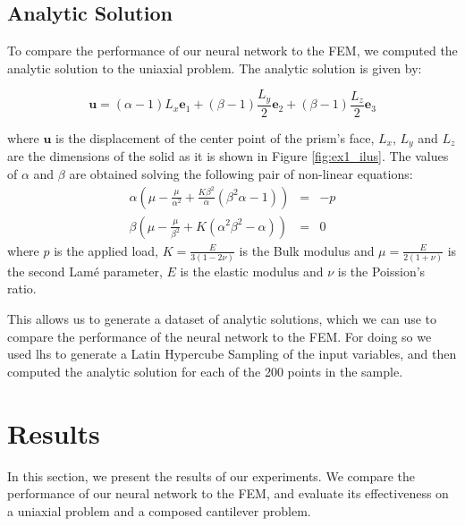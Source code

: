 \documentclass[11pt]{scrartcl} %
\begin{document}
\subsection{Analytic Solution}
To compare the performance of our neural network to the FEM, we computed the analytic solution to the uniaxial problem. The analytic solution is given by:

\begin{equation}
\label{eq:analytic_solution}
\boldsymbol{u} = 
(\alpha - 1)L_x \boldsymbol{e}_1 
+   
(\beta - 1) \frac{L_y}{2}  \boldsymbol{e}_2 
+   
(\beta - 1)\frac{L_z}{2} \boldsymbol{e}_3 
\end{equation}

where $\boldsymbol{u}$ is the displacement of the center point of the prism's face, $L_x$, $L_y$ and $L_z$ are the dimensions of the solid as it is shown in Figure \ref{fig:ex1_ilus}. The values of $\alpha$ and $\beta$ are obtained solving the following pair of non-linear equations:
%
\begin{eqnarray}
\alpha \left( 
\mu -  \frac{\mu}{\alpha^2} + \frac{K\beta^2}{\alpha} (\beta^2 \alpha -1)  
\right) &=& - p \\
\beta \left( 
	\mu -  \frac{\mu}{\beta^2} + K (\alpha^2\beta^2 - \alpha) 
 \right) &=& 0
\end{eqnarray}
%
where  $p$ is the applied load, $K = \frac{E}{3(1 - 2\nu)}$ is the Bulk modulus and $\mu = \frac{E}{2(1 + \nu)}$ is the second Lamé parameter, $E$ is the elastic modulus and $\nu$ is the Poission's ratio. 



This allows us to generate a dataset of analytic solutions, which we can use to compare the performance of the neural network to the FEM. For doing so we used lhs to generate a Latin Hypercube Sampling of the input variables, and then computed the analytic solution for each of the 200 points in the sample.


\section{Results}
In this section, we present the results of our experiments. We compare the performance of our neural network to the FEM, and evaluate its effectiveness on a uniaxial problem and a composed cantilever problem.
\end{document}
